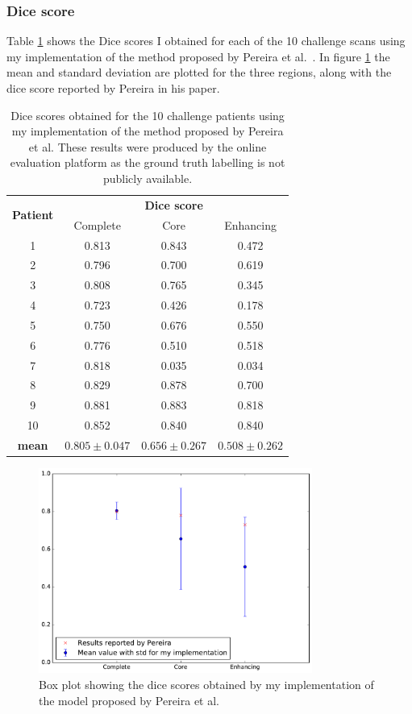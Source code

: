 \documentclass[12pt,a4paper,twoside,openright]{report}
\newlength\figureheight
\newlength\figurewidth
\begin{document}
\subsubsection{Dice score}
Table \ref{table:pereira_dice_results} shows the Dice scores I obtained for each of the 10 challenge scans using my implementation of the method proposed by Pereira et al.\ \cite{pereira}. In figure \ref{pereira_box_plot} the mean and standard deviation are plotted for the three regions, along with the dice score reported by Pereira in his paper. 
\begin{table}
\centering	
\begin{tabular}{ c | c c c} 
\multirow{2}{*}{\textbf{Patient}} & \multicolumn{3}{c}{\textbf{Dice score}} \\
 & Complete & Core & Enhancing \\
 \hline
1 & 0.813 & 0.843 & 0.472 \\
2 & 0.796 & 0.700 & 0.619 \\
3 & 0.808 & 0.765 & 0.345 \\
4 & 0.723 & 0.426 & 0.178 \\
5 & 0.750 & 0.676 & 0.550 \\
6 & 0.776 & 0.510 & 0.518 \\
7 & 0.818 & 0.035 & 0.034 \\
8 & 0.829 & 0.878 & 0.700 \\
9 & 0.881 & 0.883 & 0.818 \\
10 & 0.852 & 0.840 & 0.840 \\
\hline
\rule{0pt}{3ex}    
\textbf{mean} & $0.805 \pm 0.047$ & $0.656 \pm 0.267$ & $0.508 \pm 0.262$
\end{tabular}
\caption{Dice scores obtained for the 10 challenge patients using my implementation of the method proposed by Pereira et al. These results were produced by the online evaluation platform as the ground truth labelling is not publicly available.}
\label{table:pereira_dice_results}
\end{table}

\begin{figure}
	\centering
%	
	\includegraphics[width=0.8\textwidth]{plots/pereira_box_plot2}
	\caption{Box plot showing the dice scores obtained by my implementation of the model proposed by Pereira et al.}
	\label{pereira_box_plot}
\end{figure}
\end{document}
